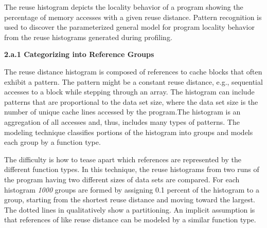 \documentclass[12pt]{article}
\begin{document}
\vspace{\baselineskip}
\begin{adjustwidth}{0.0in}{0.19in}
{\fontsize{10pt}{12.0pt}\selectfont \textcolor[HTML]{333333}{The reuse histogram depicts the locality behavior of a program showing the percentage of memory accesses with a given reuse distance. Pattern recognition is used to discover the parameterized general model for program locality behavior from the reuse histograms generated during profiling.}\par}\par

\end{adjustwidth}


\vspace{\baselineskip}
{\fontsize{10pt}{12.0pt}\selectfont \textbf{\textcolor[HTML]{333333}{2.a.1 Categorizing into Reference Groups}}\par}\par


\vspace{\baselineskip}
\begin{adjustwidth}{0.0in}{0.11in}
{\fontsize{10pt}{12.0pt}\selectfont \textcolor[HTML]{333333}{The reuse distance histogram is composed of references to cache blocks that often exhibit a pattern. The pattern might be a constant reuse distance, e.g., sequential accesses to a block while stepping through an array. The histogram can include patterns that are proportional to the data set size, where the data set size is the number of unique cache lines accessed by the program.The histogram is an aggregation of all accesses and, thus, includes many types of patterns. The modeling technique classifies portions of the histogram into groups and models each group by a function type.}\par}\par

\end{adjustwidth}


\vspace{\baselineskip}
\begin{adjustwidth}{0.0in}{0.08in}
{\fontsize{11pt}{13.2pt}\selectfont \textcolor[HTML]{333333}{The difficulty is how to tease apart which references are represented by the different function types. In this technique, the reuse histograms from two runs of the program having two different sizes of data sets are compared. For each histogram \textit{1000} groups are formed by assigning 0.1 percent of the histogram to a group, starting from the shortest reuse distance and moving toward the largest. The dotted lines in qualitatively show a partitioning. An implicit assumption is that references of like reuse distance can be modeled by a similar function type.}\par}\par

\end{adjustwidth}
\end{document}
